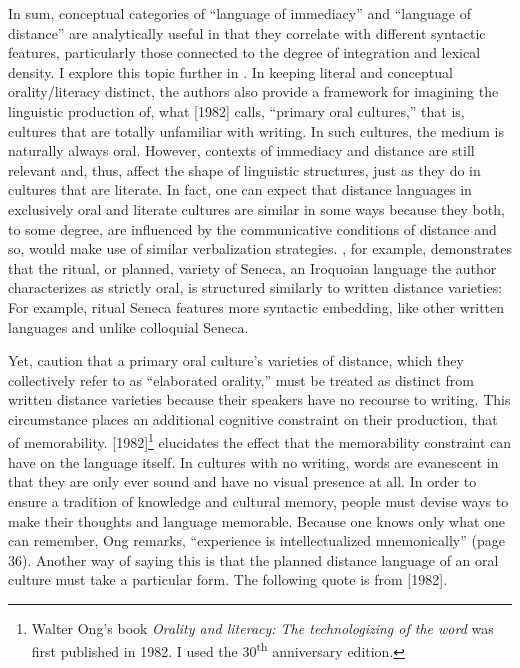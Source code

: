 In sum,   conceptual categories of “language of immediacy” and “language of distance” are analytically useful in that they correlate with different syntactic features, particularly those connected to the degree of integration and lexical density. I explore this topic further in . In keeping literal and conceptual orality\slash literacy distinct, the authors also provide a framework for imagining the linguistic production of, what \citet[11]{Ong2012} [1982] calls, “primary oral cultures,” that is, cultures that are totally unfamiliar with writing. In such cultures, the medium is naturally always oral. However, contexts of immediacy and distance are still relevant and, thus, affect the shape of linguistic structures, just as they do in cultures that are literate. In fact, one can expect that distance languages in exclusively oral and literate cultures are similar in some ways because they both, to some degree, are influenced by the communicative conditions of distance and so, would make use of similar verbalization strategies. \citet{Chafe1981}, for example, demonstrates that the ritual, or planned, variety of Seneca, an Iroquoian language the author characterizes as strictly oral, is structured similarly to written distance varieties: For example, ritual Seneca features more syntactic embedding, like other written languages and unlike colloquial Seneca.

Yet, \citet[30]{KochOesterreicher1985} caution that a primary oral culture’s varieties of distance, which they collectively refer to as “elaborated orality,” must be treated as distinct from written distance varieties because their speakers have no recourse to writing. This circumstance places an additional cognitive constraint on their production, that of memorability. \citet[31--36]{Ong2012} [1982]\footnote{\textrm{Walter Ong’s book} \textrm{\textit{Orality and literacy: The technologizing of the word}} \textrm{was first published in 1982. I used the 30}\textrm{\textsuperscript{th}} \textrm{anniversary edition.}} elucidates the effect that the memorability constraint can have on the language itself. In cultures with no writing, words are evanescent in that they are only ever sound and have no visual presence at all. In order to ensure a tradition of knowledge and cultural memory, people must devise ways to make their thoughts and language memorable. Because one knows only what one can remember, Ong remarks, “experience is intellectualized mnemonically” (page 36). Another way of saying this is that the planned distance language of an oral culture must take a particular form. The following quote is from \citet[34]{Ong2012} [1982].


